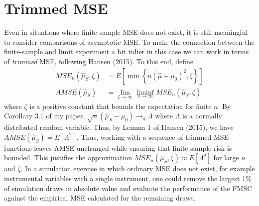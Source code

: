 \section{Trimmed MSE}
\label{append:trim}
    Even in situations where finite sample MSE does not exist, it is still meaningful to consider comparisons of asymptotic MSE.
    To make the connection between the finite-sample and limit experiment a bit tidier in this case we can work in terms of \emph{trimmed} MSE,  following Hansen (2015). 
    To this end, define
    \begin{align*}
      MSE_n(\widehat{\mu}_S, \zeta) &= E\left[ \min\left\{ n(\widehat{\mu} - \mu_0)^2, \zeta  \right\} \right]\\
      AMSE(\widehat{\mu}_S) &= \lim_{\zeta \rightarrow \infty} \liminf_{n\rightarrow \infty} MSE_n(\widehat{\mu}_S, \zeta)
    \end{align*}
    where $\zeta$ is a positive constant that bounds the expectation for finite $n$.
    By Corollary 3.1 of my paper, $\sqrt{n}(\widehat{\mu}_S-\mu_0) \rightarrow_d \Lambda$ where $\Lambda$ is a normally distributed random variable.
    Thus, by Lemma 1 of Hansen (2015), we have $AMSE(\widehat{\mu}_S) = E[\Lambda^2]$.
    Thus, working with a sequence of trimmed MSE functions leaves AMSE unchanged while ensuring that finite-sample risk is bounded.
    This justifies the approximation $MSE_n(\widehat{\mu}_S, \zeta) \approx E[\Lambda^2]$ for large $n$ and $\zeta$.
    In a simulation exercise in which ordinary MSE does not exist, for example instrumental variables with a single instrument, one could remove the largest 1\% of simulation draws in absolute value and evaluate the performance of the FMSC against the empirical MSE calculated for the remaining draws.

